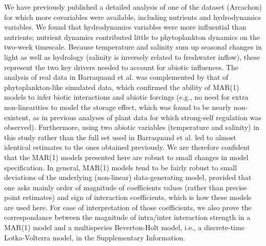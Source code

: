 \documentclass[9pt,twocolumn,twoside,lineno]{pnas-new}
\begin{document}
{We have previously published a detailed analysis of one of the dataset
(Arcachon) for which more covariables were available\cite{barraquand_coastal_2018},
including nutrients and hydrodynamics variables. We found that hydrodynamics
variables were more influential than nutrients; nutrient dynamics
contributed little to phytoplankton dynamics on the two-week timescale.
Because temperature and salinity sum up seasonal changes in light
as well as hydrology (salinity is inversely related to freshwater
inflow), these represent the two key drivers needed to account for
abiotic influences\cite{scheef_inferring_2013}. The analysis
of real data in Barraquand et al.\cite{barraquand_coastal_2018}
was complemented by that of phytoplankton-like simulated data, which
confirmed the ability of MAR(1) models to infer biotic interactions
and abiotic forcings (e.g., no need for extra non-linearities to model
the storage effect, which was found to be nearly non-existent, as
in previous analyses of plant data for which strong-self regulation
was observed\cite{adler_coexistence_2010,ellner_how_2016}).
Furthermore, using two abiotic variables (temperature and salinity)
in this study rather than the full set used in Barraquand et al.\cite{barraquand_coastal_2018}
led to almost identical estimates to the ones obtained previously\cite{barraquand_coastal_2018}.
We are therefore confident that the MAR(1) models presented here are
robust to small changes in model specification. In general, MAR(1)
models tend to be fairly robust to small deviations of the underlying
(non-linear) data-generating model, provided that one asks mainly
order of magnitude of coefficients values (rather than precise point
estimates) and sign of interaction coefficients\cite{certain_how_2018},
which is how these models are used here. For ease of interpretation
of those coefficients, we also prove the correspondance between the
magnitude of intra/inter interaction strength in a MAR(1) model and
a multispecies Beverton-Holt model, i.e., a discrete-time Lotka-Volterra
model, in the Supplementary Information.

}
\end{document}
